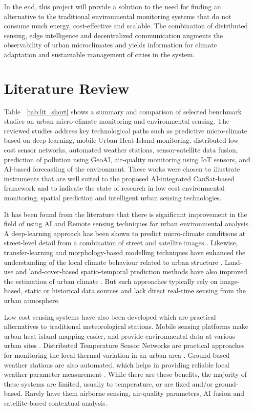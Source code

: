\documentclass[conference]{IEEEtran}
\begin{document}
In the end, this project will provide a solution to the need for finding an alternative to the traditional environmental monitoring systems that do not consume much energy, cost-effective and scalable. The combination of distributed sensing, edge intelligence and decentralized communication augments the observability of urban microclimates and yields information for climate adaptation and sustainable management of cities in the system.

\section{Literature Review}

Table ~\ref{tab:lit_short} shows a summary and comparison of selected benchmark studies on urban micro-climate monitoring and environmental sensing. The reviewed studies address key technological paths such as predictive micro-climate based on deep learning, mobile Urban Heat Island monitoring, distributed low cost sensor networks, automated weather stations, sensor-satellite data fusion, prediction of pollution using GeoAI, air-quality monitoring using IoT sensors, and AI-based forecasting of the environment. These works were chosen to illustrate instruments that are well suited to the proposed AI-integrated CanSat-based framework and to indicate the state of research in low cost environmental monitoring, spatial prediction and intelligent urban sensing technologies.

It has been found from the literature that there is significant improvement in the field of using AI and Remote sensing techniques for urban environmental analysis. A deep-learning approach has been shown to predict micro-climate conditions at street-level detail from a combination of street and satellite images \cite{x5}. Likewise, transfer-learning and morphology-based modelling techniques have enhanced the understanding of the local climate behaviour related to urban structure \cite{x7}. Land-use and land-cover-based spatio-temporal prediction methods have also improved the estimation of urban climate \cite{x8}. But such approaches typically rely on image-based, static or historical data sources and lack direct real-time sensing from the urban atmosphere.

Low cost sensing systems have also been developed which are practical alternatives to traditional meteorological stations. Mobile sensing platforms make urban heat island mapping easier, and provide environmental data at various urban sites \cite{x6}. Distributed Temperature Sensor Networks are practical approaches for monitoring the local thermal variation in an urban area \cite{x9}. Ground-based weather stations are also automated, which helps in providing reliable local weather parameter measurement \cite{x10}. While there are these benefits, the majority of these systems are limited, usually to temperature, or are fixed and/or ground-based. Rarely have them airborne sensing, air-quality parameters, AI fusion and satellite-based contextual analysis.
\end{document}
